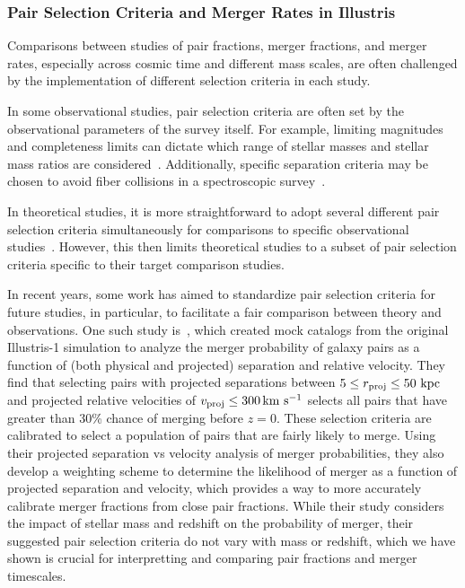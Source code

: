 \documentclass[twocolumn,linenumbers]{aastex631}
\begin{document}
        \subsubsection{Pair Selection Criteria and Merger Rates in Illustris}
            Comparisons between studies of pair fractions, merger fractions, and merger rates, especially across cosmic time and different mass scales, are often challenged by the implementation of different selection criteria in each study.
            
            In some observational studies, pair selection criteria are often set by the observational parameters of the survey itself. 
            For example, limiting magnitudes and completeness limits can dictate which range of stellar masses and stellar mass ratios are considered~\citep{Patton2000,Lotz2008,Man2016,Ventou2019}. Additionally, specific separation criteria may be chosen to avoid fiber collisions in a spectroscopic survey~\citep[as in][]{Patton2011,Besla2018}.
        
            In theoretical studies, it is more straightforward to adopt several different pair selection criteria simultaneously for comparisons to specific observational studies~\citep[i.e.][]{Lotz2011,RG2015,Besla2018,Snyder2023}. 
            However, this then limits theoretical studies to a subset of pair selection criteria specific to their target comparison studies.
    
            In recent years, some work has aimed to standardize pair selection criteria for future studies, in particular, to facilitate a fair comparison between theory and observations. 
            One such study is~\citet{Ventou2019}, which created mock catalogs from the original Illustris-1 simulation to analyze the merger probability of galaxy pairs as a function of (both physical and projected) separation and relative velocity. 
            They find that selecting pairs with projected separations between $5\leq r_{\rm proj} \leq 50\,\mathrm{\,kpc}$ and projected relative velocities of $v_{\rm proj}\leq300\,\mathrm{km}~\mathrm{s}^{-1}$ selects all pairs that have greater than 30\% chance of merging before $z=0$. 
            These selection criteria are calibrated to select a population of pairs that are fairly likely to merge.
            Using their projected separation vs velocity analysis of merger probabilities, they also develop a weighting scheme to determine the likelihood of merger as a function of projected separation and velocity, which provides a way to more accurately calibrate merger fractions from close pair fractions. 
            While their study considers the impact of stellar mass and redshift on the probability of merger, their suggested pair selection criteria do not vary with mass or redshift, which we have shown is crucial for interpretting and comparing pair fractions and merger timescales. 
\end{document}
